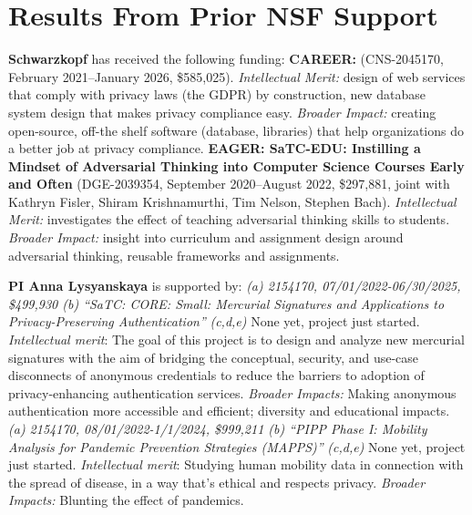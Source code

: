 %
%
%
%
%
%

\section{Results From Prior NSF Support}
\label{s:prior}

\textbf{Schwarzkopf} has received the following funding:
%
\textbf{CAREER: } (CNS-2045170, February 2021--January 2026, \$585,025).
%
\emph{Intellectual Merit:} design of web services that comply with privacy
laws (\eg the GDPR) by construction, new database system design that makes
privacy compliance easy.
%
\emph{Broader Impact:} creating open-source, off-the shelf software
(database, libraries) that help organizations do a better job at privacy
compliance.
%
\textbf{EAGER: SaTC-EDU: Instilling a Mindset of Adversarial Thinking into
Computer Science Courses Early and Often} (DGE-2039354,
September 2020--August 2022, \$297,881, joint with Kathryn Fisler, Shiram
Krishnamurthi, Tim Nelson, Stephen Bach).
%
\emph{Intellectual Merit:} investigates the effect of teaching adversarial
thinking skills to students.
%
\emph{Broader Impact:} insight into curriculum and assignment design
around adversarial thinking, reusable frameworks and assignments.
%

\noindent\textbf{PI Anna Lysyanskaya} is supported by:
\textit{(a) 2154170, 07/01/2022-06/30/2025, \$499,930 (b) ``SaTC: CORE: Small: Mercurial Signatures and Applications to Privacy-Preserving Authentication''}
\textit{(c,d,e)} None yet, project just started. \textit{ Intellectual merit}:  The goal of this project is to design and analyze new mercurial signatures with the aim of bridging the conceptual, security, and use-case disconnects of anonymous credentials to reduce the barriers to adoption of privacy-enhancing authentication services.
\textit{Broader Impacts:} Making anonymous authentication more accessible and efficient; diversity and educational impacts.  
\textit{(a) 2154170, 08/01/2022-1/1/2024, \$999,211 (b) ``PIPP Phase I: Mobility Analysis for Pandemic Prevention Strategies (MAPPS)''}
\textit{(c,d,e)} None yet, project just started. \textit{Intellectual merit}: Studying human mobility data in connection with the spread of disease, in a way that's ethical and respects privacy.
\textit{Broader Impacts:} Blunting the effect of pandemics.  
